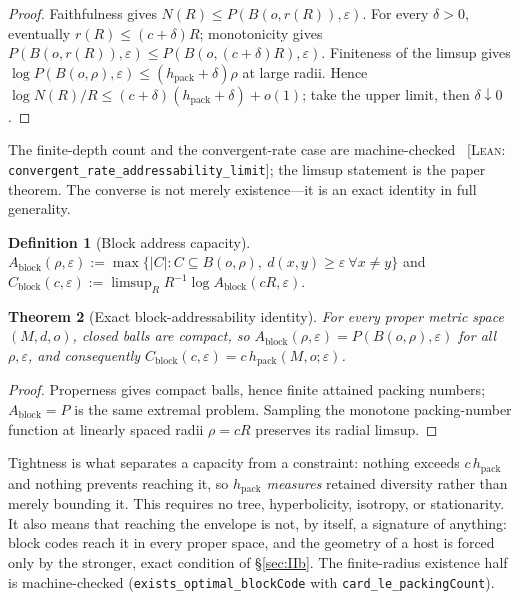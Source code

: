 \documentclass[11pt,reqno]{amsart}
\theoremstyle{plain}
\newtheorem{theorem}{Theorem}[section]
\theoremstyle{definition}
\newtheorem{definition}[theorem]{Definition}
\newcommand{\hpack}{h_{\mathrm{pack}}}
\newcommand{\Cblock}{C_{\mathrm{block}}}
\newcommand{\eps}{\varepsilon}
\newcommand{\cert}[1]{{\footnotesize\ [\textsc{Lean}: \texttt{#1}]}}
\begin{document}
\begin{proof}
Faithfulness gives $N(R)\le P(B(o,r(R)),\eps)$. For every $\delta>0$, eventually $r(R)\le(c+\delta)R$; monotonicity gives $P(B(o,r(R)),\eps)\le P(B(o,(c+\delta)R),\eps)$. Finiteness of the limsup gives $\log P(B(o,\rho),\eps)\le(\hpack+\delta)\rho$ at large radii. Hence $\log N(R)/R\le(c+\delta)(\hpack+\delta)+o(1)$; take the upper limit, then $\delta\downarrow0$.
\end{proof}

The finite-depth count and the convergent-rate case are machine-checked \cert{convergent\_\allowbreak{}rate\_\allowbreak{}addressability\_\allowbreak{}limit}; the limsup statement is the paper theorem. The converse is not merely existence---it is an exact identity in full generality.

\begin{definition}[Block address capacity]
$A_{\mathrm{block}}(\rho,\eps):=\max\{|C|:C\subseteq B(o,\rho),\ d(x,y)\ge\eps\ \forall x\ne y\}$ and $\Cblock(c,\eps):=\limsup_R R^{-1}\log A_{\mathrm{block}}(cR,\eps)$.
\end{definition}

\begin{theorem}[Exact block-addressability identity]\label{thm:block}
For every proper metric space $(M,d,o)$, closed balls are compact, so $A_{\mathrm{block}}(\rho,\eps)=P(B(o,\rho),\eps)$ for all $\rho,\eps$, and consequently $\Cblock(c,\eps)=c\,\hpack(M,o;\eps)$.
\end{theorem}

\begin{proof}
Properness gives compact balls, hence finite attained packing numbers; $A_{\mathrm{block}}=P$ is the same extremal problem. Sampling the monotone packing-number function at linearly spaced radii $\rho=cR$ preserves its radial limsup.
\end{proof}

Tightness is what separates a capacity from a constraint: nothing exceeds $c\,\hpack$ and nothing prevents reaching it, so $\hpack$ \emph{measures} retained diversity rather than merely bounding it. This requires no tree, hyperbolicity, isotropy, or stationarity. It also means that reaching the envelope is not, by itself, a signature of anything: block codes reach it in every proper space, and the geometry of a host is forced only by the stronger, exact condition of \S\ref{sec:IIb}. The finite-radius existence half is machine-checked (\texttt{exists\_\allowbreak{}optimal\_\allowbreak{}blockCode} with \texttt{card\_\allowbreak{}le\_\allowbreak{}packingCount}).
\end{document}
